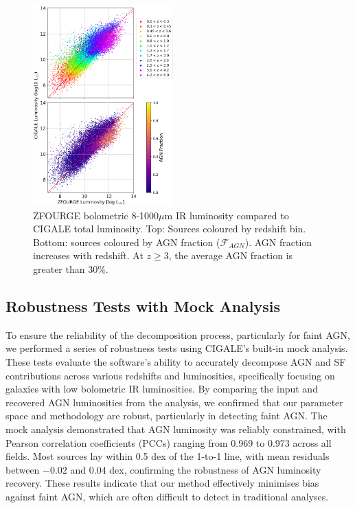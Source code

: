 \begin{figure}
    \centering
    \includegraphics[width=0.48\textwidth]{Figures/LIR_vs_LIR.png}
    \caption{ZFOURGE bolometric 8-1000$\mu$m IR luminosity compared to CIGALE total luminosity. Top: Sources coloured by redshift bin. Bottom: sources coloured by AGN fraction ($\mathcal{F}_{AGN}$). AGN fraction increases with redshift. At $z \geq 3$, the average AGN fraction is greater than 30\%.}
    \label{Fig: LIR vs LIR}
\end{figure}

\subsection{Robustness Tests with Mock Analysis} \label{Sec: Mock_Analysis}
To ensure the reliability of the decomposition process, particularly for faint AGN, we performed a series of robustness tests using CIGALE's built-in mock analysis. These tests evaluate the software's ability to accurately decompose AGN and SF contributions across various redshifts and luminosities, specifically focusing on galaxies with low bolometric IR luminosities. By comparing the input and recovered AGN luminosities from the analysis, we confirmed that our parameter space and methodology are robust, particularly in detecting faint AGN. The mock analysis demonstrated that AGN luminosity was reliably constrained, with Pearson correlation coefficients (PCCs) ranging from 0.969 to 0.973 across all fields. Most sources lay within 0.5 dex of the 1-to-1 line, with mean residuals between $-0.02$ and $0.04$ dex, confirming the robustness of AGN luminosity recovery. These results indicate that our method effectively minimises bias against faint AGN, which are often difficult to detect in traditional analyses.

